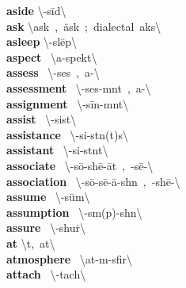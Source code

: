\documentclass[10pt,a4paper]{article}
\begin{document}
\begin{multicols}{2}
\textbf{ aside }\quad \textbackslash \textschwa -\textprimstress s\={i}d\textbackslash \\
\textbf{ ask }\quad \textbackslash \textprimstress ask\ ,\ \textprimstress \"{a}sk\ ;\ dialectal\ \textprimstress aks\textbackslash \\
\textbf{ asleep }\quad \textbackslash \textschwa -\textprimstress sl\={e}p\textbackslash \\
\textbf{ aspect }\quad \ \textbackslash \textprimstress a-\textsecstress spekt\textbackslash \\
\textbf{ assess }\quad \ \textbackslash \textschwa -\textprimstress ses\ ,\ a-\textbackslash \\
\textbf{ assessment }\quad \ \textbackslash \textschwa -\textprimstress ses-m\textschwa nt\ ,\ a-\textbackslash \\
\textbf{ assignment }\quad \ \textbackslash \textschwa -\textprimstress s\={i}n-m\textschwa nt\textbackslash \\
\textbf{ assist }\quad \ \textbackslash \textschwa -\textprimstress sist\textbackslash \\
\textbf{ assistance }\quad \ \textbackslash \textschwa -\textprimstress si-st\textschwa n(t)s\textbackslash \\
\textbf{ assistant }\quad \ \textbackslash \textschwa -\textprimstress si-st\textschwa nt\textbackslash \\
\textbf{ associate }\quad \ \textbackslash \textschwa -\textprimstress s\={o}-sh\={e}-\textsecstress \={a}t\ ,\ -s\={e}-\textbackslash \\
\textbf{ association }\quad \ \textbackslash \textschwa -\textsecstress s\={o}-s\={e}-\textprimstress \={a}-sh\textschwa n\ ,\ -sh\={e}-\textbackslash \\
\textbf{ assume }\quad \ \textbackslash \textschwa -\textprimstress s\"{u}m\textbackslash \\
\textbf{ assumption }\quad \ \textbackslash \textschwa -\textprimstress s\textschwa m(p)-sh\textschwa n\textbackslash \\
\textbf{ assure }\quad \ \textbackslash \textschwa -\textprimstress shu\. r\textbackslash \\
\textbf{ at }\quad \textbackslash \textschwa t,\ \textprimstress at\textbackslash \\
\textbf{ atmosphere }\quad \ \textbackslash \textprimstress at-m\textschwa -\textsecstress sfir\textbackslash \\
\textbf{ attach }\quad \ \textbackslash \textschwa -\textprimstress tach\textbackslash \\

\end{multicols}
\end{document}
